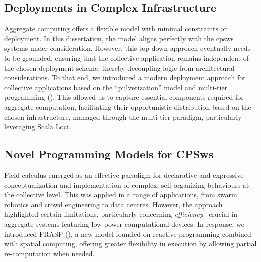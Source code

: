\subsection*{Deployments in Complex Infrastructure}
Aggregate computing offers a flexible model with minimal constraints on deployment. 
 In this dissertation, 
 the model aligns perfectly with the \acp{cpsw} systems under consideration. 
 However, this top-down approach eventually needs to be grounded, 
 ensuring that the collective application remains independent of the chosen deployment scheme, 
 thereby decoupling logic from architectural considerations.
%
To that end, 
 we introduced a modern deployment approach for collective applications based on the ``pulverization'' model and multi-tier programming (). 
 This allowed us to capture essential components required for aggregate computation, 
 facilitating their opportunistic distribution based on the chosen infrastructure, 
 managed through the multi-tier paradigm, 
 particularly leveraging Scala Loci.

\subsection*{Novel Programming Models for CPSws}
Field calculus emerged as an effective paradigm for declarative and expressive conceptualization and implementation of complex, 
 self-organizing behaviours at the collective level. 
% 
This was applied in a range of applications, 
 from swarm robotics and crowd engineering to data centres.
% 
However, the approach highlighted certain limitations,   particularly concerning \emph{efficiency}--
 crucial in aggregate systems featuring low-power computational devices. 
 In response, we introduced FRASP (), 
 a new model founded on reactive programming combined with spatial computing, offering greater flexibility in execution by allowing partial re-computation when needed.

